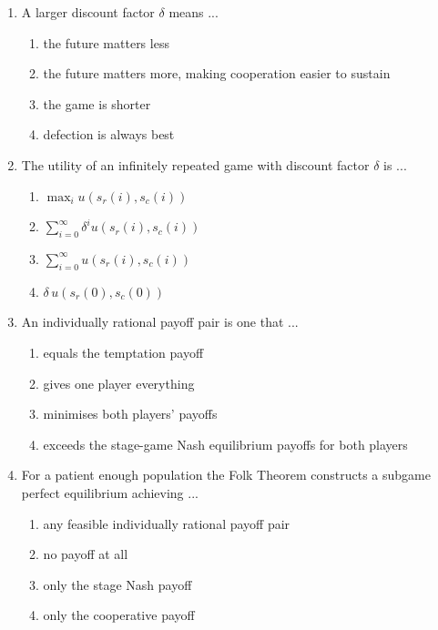 \documentclass[11pt]{article}
\begin{document}
\begin{enumerate}[itemsep=6pt]
\begin{enumerate}
    \item the gain from a one-off defection followed by punishment
    \item the discount factor
    \item the total of all stage payoffs
  \end{enumerate}
  \item A larger discount factor \(\delta\) means ...
  \begin{enumerate}
    \item the future matters less
    \item the future matters more, making cooperation easier to sustain
    \item the game is shorter
    \item defection is always best
  \end{enumerate}
  \item The utility of an infinitely repeated game with discount factor \(\delta\) is ...
  \begin{enumerate}
    \item \(\max_i u(s_r(i), s_c(i))\)
    \item \(\sum_{i=0}^{\infty} \delta^i u(s_r(i), s_c(i))\)
    \item \(\sum_{i=0}^{\infty} u(s_r(i), s_c(i))\)
    \item \(\delta \, u(s_r(0), s_c(0))\)
  \end{enumerate}
  \item An individually rational payoff pair is one that ...
  \begin{enumerate}
    \item equals the temptation payoff
    \item gives one player everything
    \item minimises both players' payoffs
    \item exceeds the stage-game Nash equilibrium payoffs for both players
  \end{enumerate}
  \item For a patient enough population the Folk Theorem constructs a subgame perfect equilibrium achieving ...
  \begin{enumerate}
    \item any feasible individually rational payoff pair
    \item no payoff at all
    \item only the stage Nash payoff
    \item only the cooperative payoff
  \end{enumerate}

\end{enumerate}
\end{document}
